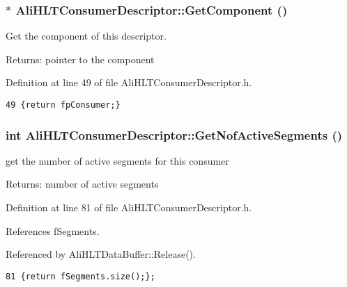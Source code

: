 \subsubsection{$\ast$ Ali\-HLTConsumer\-Descriptor::Get\-Component ()\hspace{0.3cm}{\tt  [inline]}}\label{classAliHLTConsumerDescriptor_a5}


Get the component of this descriptor. \begin{Desc}
\item[Returns:]pointer to the component \end{Desc}


Definition at line 49 of file Ali\-HLTConsumer\-Descriptor.h.

\footnotesize\begin{verbatim}49 {return fpConsumer;}
\end{verbatim}\normalsize 


\subsubsection{\setlength{\rightskip}{0pt plus 5cm}int Ali\-HLTConsumer\-Descriptor::Get\-Nof\-Active\-Segments ()\hspace{0.3cm}{\tt  [inline]}}\label{classAliHLTConsumerDescriptor_a8}


get the number of active segments for this consumer \begin{Desc}
\item[Returns:]number of active segments \end{Desc}


Definition at line 81 of file Ali\-HLTConsumer\-Descriptor.h.

References f\-Segments.

Referenced by Ali\-HLTData\-Buffer::Release().

\footnotesize\begin{verbatim}81 {return fSegments.size();};
\end{verbatim}\normalsize 



